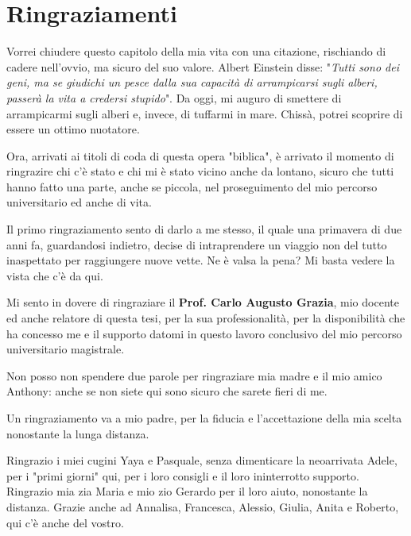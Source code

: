 \chapter*{Ringraziamenti} %
Vorrei chiudere questo capitolo della mia vita con una citazione, rischiando di cadere nell'ovvio, ma sicuro del suo valore. Albert Einstein disse: "\textit{Tutti sono dei geni, ma se giudichi un pesce dalla sua capacità di arrampicarsi sugli alberi, passerà la vita a credersi stupido}". Da oggi, mi auguro di smettere di arrampicarmi sugli alberi e, invece, di tuffarmi in mare. Chissà, potrei scoprire di essere un ottimo nuotatore.

Ora, arrivati ai titoli di coda di questa opera "biblica", è arrivato il momento di ringrazire chi c'è stato e chi mi è stato vicino anche da lontano, sicuro che tutti hanno fatto una parte, anche se piccola, nel proseguimento del mio percorso universitario ed anche di vita.

Il primo ringraziamento sento di darlo a me stesso, il quale una primavera di due anni fa, guardandosi indietro, decise di intraprendere un viaggio non del tutto inaspettato per raggiungere nuove vette. Ne è valsa la pena? Mi basta vedere la vista che c'è da qui.

Mi sento in dovere di ringraziare  il \textbf{Prof. Carlo Augusto Grazia}, mio docente ed anche relatore di questa tesi, per la sua professionalità, per la disponibilità che ha concesso me e il supporto datomi in questo lavoro conclusivo del mio percorso universitario magistrale. 

Non posso non spendere due parole per ringraziare mia madre e il mio amico Anthony: anche se non siete qui sono sicuro che sarete fieri di me.

Un ringraziamento va a mio padre, per la fiducia e l'accettazione della mia scelta nonostante la lunga distanza.

Ringrazio i miei cugini Yaya e Pasquale, senza dimenticare la neoarrivata Adele, per i "primi giorni" qui, per i loro consigli e il loro ininterrotto supporto. Ringrazio mia zia Maria e mio zio Gerardo per il loro aiuto, nonostante la distanza. Grazie anche ad Annalisa, Francesca, Alessio, Giulia, Anita e Roberto, qui c'è anche del vostro.

